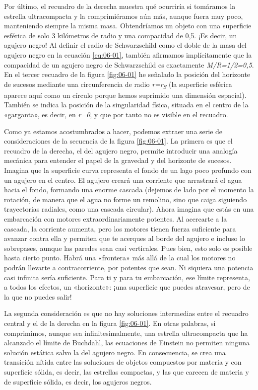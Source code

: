 Por último, el recuadro de la derecha muestra qué ocurriría si tomáramos la estrella ultracompacta y la comprimiéramos aún más, aunque fuera muy poco, manteniendo siempre la misma masa. Obtendríamos un objeto con una superficie esférica de solo 3 kilómetros de radio y una compacidad de 0,5. ¡Es decir, un agujero negro! Al definir el radio de Schwarzschild como el doble de la masa del agujero negro en la ecuación \eqref{eq:06-01}, también afirmamos implícitamente que la compacidad de un agujero negro de Schwarzschild es exactamente \emph{M/R=1/2=0,5}. En el tercer recuadro de la figura \ref{fig:06-01} he señalado la posición del horizonte de sucesos mediante una circunferencia de radio \emph{r=r\textsubscript{S}} (la superficie esférica aparece aquí como un círculo porque hemos suprimido una dimensión espacial). También se indica la posición de la singularidad física, situada en el centro de la «garganta», es decir, en \emph{r=0}, y que por tanto no es visible en el recuadro.

Como ya estamos acostumbrados a hacer, podemos extraer una serie de consideraciones de la secuencia de la figura \ref{fig:06-01}. La primera es que el recuadro de la derecha, el del agujero negro, permite introducir una analogía mecánica para entender el papel de la gravedad y del horizonte de sucesos. Imagina que la superficie curva representa el fondo de un lago poco profundo con un agujero en el centro. El agujero creará una corriente que arrastrará el agua hacia el fondo, formando una enorme cascada (dejemos de lado por el momento la rotación, de manera que el agua no forme un remolino, sino que caiga siguiendo trayectorias radiales, como una cascada circular). Ahora imagina que estás en una embarcación con motores extraordinariamente potentes. Al acercarte a la cascada, la corriente aumenta, pero los motores tienen fuerza suficiente para avanzar contra ella y permiten que te acerques al borde del agujero e incluso lo sobrepases, aunque las paredes sean casi verticales. Pues bien, esto solo es posible hasta cierto punto. Habrá una «frontera» más allá de la cual los motores no podrán llevarte a contracorriente, por potentes que sean. Ni siquiera una potencia casi infinita sería suficiente. Para ti y para tu embarcación, ese límite representa, a todos los efectos, un «horizonte»: ¡una superficie que puedes atravesar, pero de la que no puedes salir!

La segunda consideración es que no hay soluciones intermedias entre el recuadro central y el de la derecha en la figura \ref{fig:06-01}. En otras palabras, si comprimimos, aunque sea infinitesimalmente, una estrella ultracompacta que ha alcanzado el límite de Buchdahl, las ecuaciones de Einstein no permiten ninguna solución estática salvo la del agujero negro. En consecuencia, se crea una transición nítida entre las soluciones de objetos compuestos por materia y con superficie sólida, es decir, las estrellas compactas, y las que carecen de materia y de superficie sólida, es decir, los agujeros negros.

